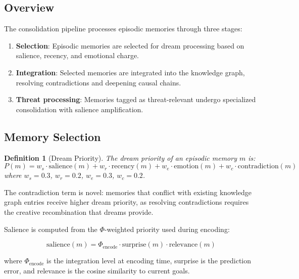 \documentclass[11pt,a4paper]{article}
\newtheorem{definition}{Definition}
\begin{document}
\subsection{Overview}

The consolidation pipeline processes episodic memories through three stages:

\begin{enumerate}[nosep]
    \item \textbf{Selection}: Episodic memories are selected for dream processing based on salience, recency, and emotional charge.
    \item \textbf{Integration}: Selected memories are integrated into the knowledge graph, resolving contradictions and deepening causal chains.
    \item \textbf{Threat processing}: Memories tagged as threat-relevant undergo specialized consolidation with salience amplification.
\end{enumerate}

\subsection{Memory Selection}

\begin{definition}[Dream Priority]
The dream priority of an episodic memory $m$ is:
\begin{equation}
P(m) = w_s \cdot \text{salience}(m) + w_r \cdot \text{recency}(m) + w_e \cdot \text{emotion}(m) + w_c \cdot \text{contradiction}(m)
\end{equation}
where $w_s = 0.3$, $w_r = 0.2$, $w_e = 0.3$, $w_c = 0.2$.
\end{definition}

The contradiction term is novel: memories that conflict with existing knowledge graph entries receive higher dream priority, as resolving contradictions requires the creative recombination that dreams provide.

Salience is computed from the $\Phi$-weighted priority used during encoding:

\begin{equation}
\text{salience}(m) = \Phi_{\text{encode}} \cdot \text{surprise}(m) \cdot \text{relevance}(m)
\end{equation}

where $\Phi_{\text{encode}}$ is the integration level at encoding time, surprise is the prediction error, and relevance is the cosine similarity to current goals.
\end{document}
